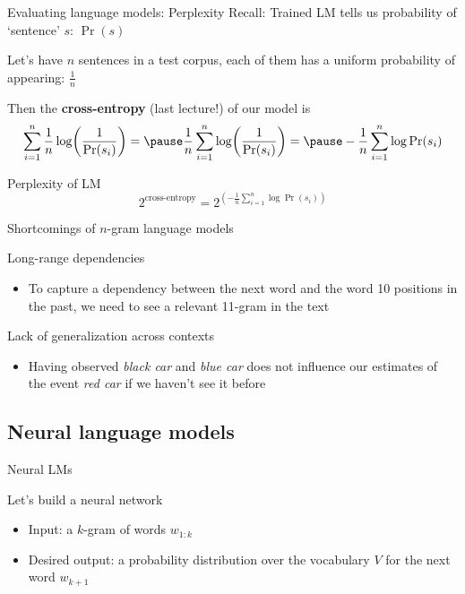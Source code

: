 \documentclass[12pt,aspectratio=169,handout]{beamer}
\begin{document}
\begin{frame}{Evaluating language models: Perplexity}
Recall: Trained LM tells us probability of `sentence' $s$: $\Pr(s)$

\pause
Let's have $n$ sentences in a test corpus, each of them has a uniform probability of appearing: $\frac{1}{n}$

\pause
Then the \textbf{cross-entropy} (last lecture!) of our model is
$$
\sum_{i = 1}^{n} \frac{1}{n} \log (\frac{1}{\Pr(s_i)}) = \pause
\frac{1}{n} \sum_{i = 1}^{n} \log (\frac{1}{\Pr(s_i)}) = \pause
- \frac{1}{n} \sum_{i = 1}^{n} \log \Pr(s_i)
$$
\pause \begin{block}{Perplexity of LM}
$$
2^{\text{cross-entropy}} = 
2^{\left(- \frac{1}{n} \sum_{i = 1}^{n} \log \Pr(s_i)\right)}
$$
\end{block}

\end{frame}

\begin{frame}{Shortcomings of $n$-gram language models}

\pause
Long-range dependencies
\begin{itemize}
	\item To capture a dependency between the next word and the word 10 positions in the past, we need to see a relevant 11-gram in the text
\end{itemize}

\pause
Lack of generalization across contexts
\begin{itemize}
	\item Having observed \emph{black car} and \emph{blue car} does not influence our estimates of the event \emph{red car} if we haven't see it before
\end{itemize}


\end{frame}

\subsection{Neural language models}

\begin{frame}{Neural LMs}

Let's build a neural network
\begin{itemize}
	\item Input: a $k$-gram of words $w_{1:k}$
	\item Desired output: a probability distribution over the vocabulary $V$ for the next word $w_{k+1}$
\end{itemize}

\end{frame}
\end{document}
